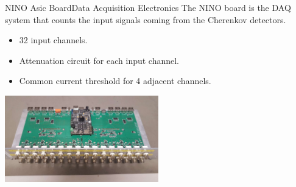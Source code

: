 \documentclass[9pt,a4paper]{beamer}
\begin{document}
\begin{frame}[t]{NINO Asic Board}{Data Acquisition Electronics}
The NINO board is the DAQ system that counts the input signals coming from the Cherenkov detectors. 

\begin{itemize}
\item 32 input channels.
\item Attenuation circuit for each input channel.
\item Common current threshold for 4 adjacent channels.
\end{itemize}

\begin{center}
\includegraphics[width = 0.5\textwidth]{figures/NINO.pdf}
\end{center}
\end{frame}
\end{document}
